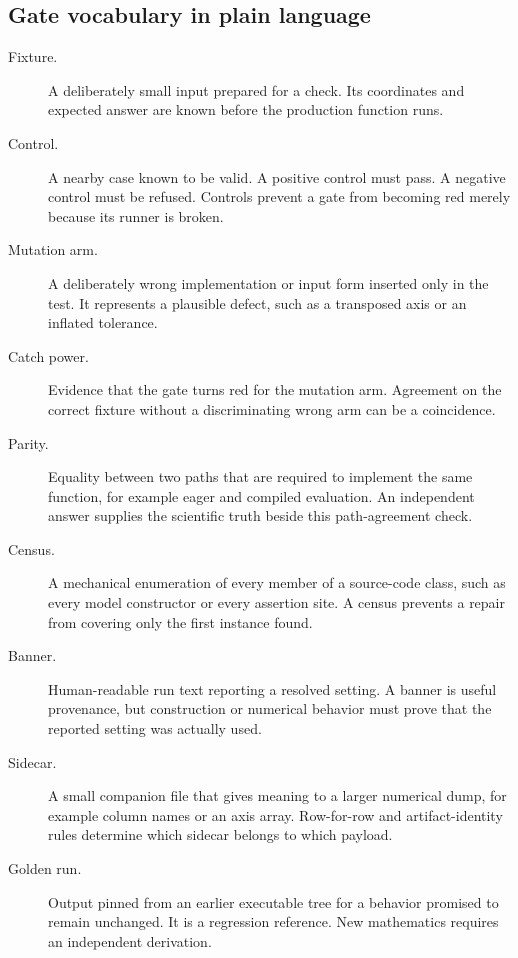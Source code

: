 \documentclass[10pt,aps,prd,twocolumn,nofootinbib]{revtex4-2}
\begin{document}
\subsection{Gate vocabulary in plain language}

\begin{description}
  \item[Fixture.] A deliberately small input prepared for a check.  Its
  coordinates and expected answer are known before the production function
  runs.

  \item[Control.] A nearby case known to be valid.  A positive control must
  pass.  A negative control must be refused.  Controls prevent a gate from
  becoming red merely because its runner is broken.

  \item[Mutation arm.] A deliberately wrong implementation or input form
  inserted only in the test.  It represents a plausible defect, such as a
  transposed axis or an inflated tolerance.

  \item[Catch power.] Evidence that the gate turns red for the mutation
  arm.  Agreement on the correct fixture without a discriminating wrong arm
  can be a coincidence.

  \item[Parity.] Equality between two paths that are required to implement
  the same function, for example eager and compiled evaluation.  An
  independent answer supplies the scientific truth beside this path-agreement
  check.

  \item[Census.] A mechanical enumeration of every member of a source-code
  class, such as every model constructor or every assertion site.  A census
  prevents a repair from covering only the first instance found.

  \item[Banner.] Human-readable run text reporting a resolved setting.  A
  banner is useful provenance, but construction or numerical behavior must
  prove that the reported setting was actually used.

  \item[Sidecar.] A small companion file that gives meaning to a larger
  numerical dump, for example column names or an axis array.  Row-for-row and
  artifact-identity rules determine which sidecar belongs to which payload.

  \item[Golden run.] Output pinned from an earlier executable tree for a
  behavior promised to remain unchanged.  It is a regression reference.  New
  mathematics requires an independent derivation.


\end{description}
\end{document}
